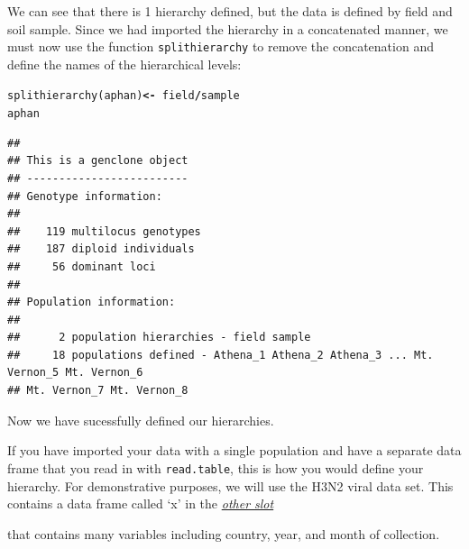 \documentclass[letterpaper]{article}\usepackage[]{graphicx}\usepackage[]{color}
\makeatletter
\newcommand{\hlopt}[1]{\textcolor[rgb]{1,0,0.502}{\textbf{#1}}}%
\newcommand{\hlstd}[1]{\textcolor[rgb]{0,0,0}{#1}}%
\newcommand{\hlkwb}[1]{\textcolor[rgb]{0.502,0.502,0.753}{\textbf{#1}}}%
\newcommand{\hlkwd}[1]{\textcolor[rgb]{0,0.267,0.4}{#1}}%
\newenvironment{kframe}{%
 \def\at@end@of@kframe{}%
 \ifinner\ifhmode%
  \def\at@end@of@kframe{\end{minipage}}%
  \begin{minipage}{\columnwidth}%
 \fi\fi%
 \def\FrameCommand##1{\hskip\@totalleftmargin \hskip-\fboxsep
 \colorbox{shadecolor}{##1}\hskip-\fboxsep
     \hskip-\linewidth \hskip-\@totalleftmargin \hskip\columnwidth}%
 \MakeFramed {\advance\hsize-\width
   \@totalleftmargin\z@ \linewidth\hsize
   \@setminipage}}%
 {\par\unskip\endMakeFramed%
 \at@end@of@kframe}
\newenvironment{knitrout}{}{} %
\newcommand{\seclink}[2]{
  \textit{\hyperref[#1]{#2}}
}
\makeatother
\begin{document}
\noindent
We can see that there is 1 hierarchy defined, but the data is defined by field
and soil sample. Since we had imported the hierarchy in a concatenated manner,
we must now use the function \texttt{splithierarchy} to remove the concatenation
and define the names of the hierarchical levels:

\begin{knitrout}\footnotesize
{}\color{fgcolor}\begin{kframe}
\begin{alltt}
\hlkwd{splithierarchy}\hlstd{(aphan)} \hlkwb{<-} \hlopt{~}\hlstd{field}\hlopt{/}\hlstd{sample}
\hlstd{aphan}
\end{alltt}
\begin{verbatim}
## 
## This is a genclone object
## -------------------------
## Genotype information:
## 
##    119 multilocus genotypes
##    187 diploid individuals
##     56 dominant loci
## 
## Population information:
## 
##      2 population hierarchies - field sample
##     18 populations defined - Athena_1 Athena_2 Athena_3 ... Mt. Vernon_5 Mt. Vernon_6 
## Mt. Vernon_7 Mt. Vernon_8
\end{verbatim}
\end{kframe}
\end{knitrout}

\noindent
Now we have sucessfully defined our hierarchies.

If you have imported your data with a single population and have a separate data
frame that you read in with \texttt{read.table}, this is how you would define
your hierarchy. For demonstrative purposes, we will use the H3N2 viral data set.
This contains a data frame called `x' in the \seclink{intro:genind:other}{other slot}
that contains many variables including country, year, and month of collection. 
\end{document}
